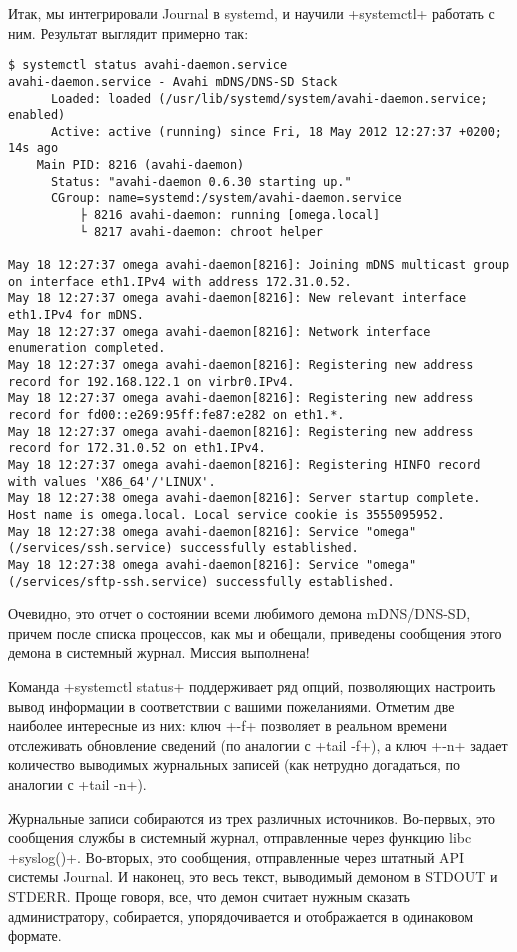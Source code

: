 \documentclass[10pt,oneside,a4paper]{article}
\begin{document}
Итак, мы интегрировали Journal в systemd, и научили +systemctl+ работать с ним.
Результат выглядит примерно так:
\begin{Verbatim}[fontsize=\small]
$ systemctl status avahi-daemon.service
avahi-daemon.service - Avahi mDNS/DNS-SD Stack
	  Loaded: loaded (/usr/lib/systemd/system/avahi-daemon.service; enabled)
	  Active: active (running) since Fri, 18 May 2012 12:27:37 +0200; 14s ago
	Main PID: 8216 (avahi-daemon)
	  Status: "avahi-daemon 0.6.30 starting up."
	  CGroup: name=systemd:/system/avahi-daemon.service
		  ├ 8216 avahi-daemon: running [omega.local]
		  └ 8217 avahi-daemon: chroot helper

May 18 12:27:37 omega avahi-daemon[8216]: Joining mDNS multicast group on interface eth1.IPv4 with address 172.31.0.52.
May 18 12:27:37 omega avahi-daemon[8216]: New relevant interface eth1.IPv4 for mDNS.
May 18 12:27:37 omega avahi-daemon[8216]: Network interface enumeration completed.
May 18 12:27:37 omega avahi-daemon[8216]: Registering new address record for 192.168.122.1 on virbr0.IPv4.
May 18 12:27:37 omega avahi-daemon[8216]: Registering new address record for fd00::e269:95ff:fe87:e282 on eth1.*.
May 18 12:27:37 omega avahi-daemon[8216]: Registering new address record for 172.31.0.52 on eth1.IPv4.
May 18 12:27:37 omega avahi-daemon[8216]: Registering HINFO record with values 'X86_64'/'LINUX'.
May 18 12:27:38 omega avahi-daemon[8216]: Server startup complete. Host name is omega.local. Local service cookie is 3555095952.
May 18 12:27:38 omega avahi-daemon[8216]: Service "omega" (/services/ssh.service) successfully established.
May 18 12:27:38 omega avahi-daemon[8216]: Service "omega" (/services/sftp-ssh.service) successfully established.
\end{Verbatim}
Очевидно, это отчет о состоянии всеми любимого демона mDNS/DNS-SD, причем после
списка процессов, как мы и обещали, приведены сообщения этого демона в системный
журнал. Миссия выполнена!

Команда +systemctl status+ поддерживает ряд опций, позволяющих настроить вывод
информации в соответствии с вашими пожеланиями. Отметим две наиболее интересные
из них: ключ +-f+ позволяет в реальном времени отслеживать обновление сведений
(по аналогии с +tail -f+), а ключ +-n+ задает количество выводимых журнальных
записей (как нетрудно догадаться, по аналогии с +tail -n+).

Журнальные записи собираются из трех различных источников. Во-первых, это
сообщения службы в системный журнал, отправленные через функцию libc
+syslog()+. Во-вторых, это сообщения, отправленные через штатный API системы
Journal. И наконец, это весь текст, выводимый демоном в STDOUT и STDERR. Проще
говоря, все, что демон считает нужным сказать администратору, собирается,
упорядочивается и отображается в одинаковом формате.
\end{document}
